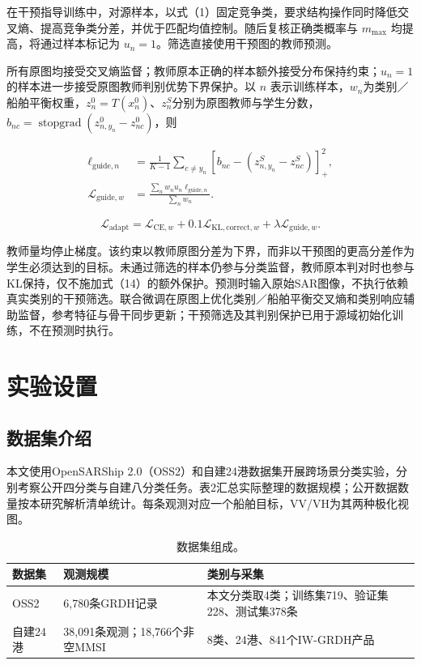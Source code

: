 \documentclass[journal,10pt,a4paper]{IEEEtran}
\begin{document}
在干预指导训练中，对源样本，以式（1）固定竞争类，要求结构操作同时降低交叉熵、提高竞争类分差，并优于匹配均值控制。随后复核正确类概率与 \(m_{\max}\) 均提高，将通过样本标记为 \(u_n=1\)。筛选直接使用干预图的教师预测。

所有原图均接受交叉熵监督；教师原本正确的样本额外接受分布保持约束；\(u_n=1\)的样本进一步接受原图教师判别优势下界保护。以 \(n\) 表示训练样本，\(w_n\)为类别／船舶平衡权重，\(z_n^0=T(x_n^0)\)、\(z_n^S\)分别为原图教师与学生分数，\(b_{nc}=\operatorname{stopgrad}(z^0_{n,y_n}-z^0_{nc})\)，则

\[\begin{aligned}
\ell_{\mathrm{guide},n}
&=\frac{1}{K-1}\sum_{c\ne y_n}[b_{nc}-(z^S_{n,y_n}-z^S_{nc})]_+^2,\\
\mathcal L_{\mathrm{guide},w}
&=\frac{\sum_n w_nu_n\ell_{\mathrm{guide},n}}{\sum_n w_n}.
\end{aligned}\tag{14}\]

\[\mathcal L_{\mathrm{adapt}}=\mathcal L_{\mathrm{CE},w}+0.1\mathcal L_{\mathrm{KL,correct},w}+\lambda\mathcal L_{\mathrm{guide},w}.\tag{15}\]

教师量均停止梯度。该约束以教师原图分差为下界，而非以干预图的更高分差作为学生必须达到的目标。未通过筛选的样本仍参与分类监督，教师原本判对时也参与KL保持，仅不施加式（14）的额外保护。预测时输入原始SAR图像，不执行依赖真实类别的干预筛选。联合微调在原图上优化类别／船舶平衡交叉熵和类别响应辅助监督，参考特征与骨干同步更新；干预筛选及其判别保护已用于源域初始化训练，不在预测时执行。

\FloatBarrier

\section{实验设置}\label{ux5b9eux9a8cux8bbeux7f6e}

\subsection{数据集介绍}\label{ux6570ux636eux96c6ux4ecbux7ecd}

本文使用OpenSARShip 2.0（OSS2）和自建24港数据集开展跨场景分类实验，分别考察公开四分类与自建八分类任务。表2汇总实际整理的数据规模；公开数据数量按本研究解析清单统计。每条观测对应一个船舶目标，VV/VH为其两种极化视图。

\begin{table}[H]
\centering\footnotesize
\setcounter{table}{1}
\caption{数据集组成。}
\label{tab:2}
\setlength{\tabcolsep}{3pt}\renewcommand{\arraystretch}{1.2}
\begin{tabularx}{\linewidth}{LLL}
\toprule
数据集 & 观测规模 & 类别与采集 \\
\midrule
OSS2 & 6,780条GRDH记录 & 本文分类取4类；训练集719、验证集228、测试集378条 \\
自建24港 & 38,091条观测；18,766个非空MMSI & 8类、24港、841个IW-GRDH产品 \\
\bottomrule
\end{tabularx}
\end{table}
\end{document}
